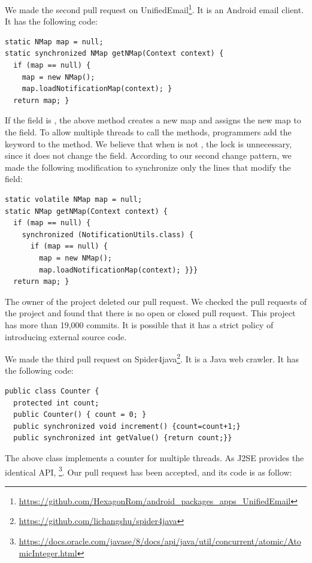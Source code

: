 We made the second pull request on UnifiedEmail\footnote{\url{https://github.com/HexagonRom/android_packages_apps_UnifiedEmail}}. It is an Android email client. It has the following code:

\begin{lstlisting}
static NMap map = null;
static synchronized NMap getNMap(Context context) {
  if (map == null) {
    map = new NMap();
    map.loadNotificationMap(context); }
  return map; }
\end{lstlisting}

If the  field is , the above method creates a new map and assigns the new map to the field. To allow multiple threads to call the methods, programmers add the  keyword to the method. We believe that when  is not , the lock is unnecessary, since it does not change the field. According to our second change pattern, we made the following modification to synchronize only the lines that modify the field:

\begin{lstlisting}
static volatile NMap map = null;
static NMap getNMap(Context context) {
  if (map == null) {
    synchronized (NotificationUtils.class) {
      if (map == null) {
        map = new NMap();
        map.loadNotificationMap(context); }}}
  return map; }
\end{lstlisting}

The owner of the project deleted our pull request. We checked the pull requests of the project and found that there is no open or closed pull request. This project has more than 19,000 commits. It is possible that it has a strict policy of introducing external source code.



We made the third pull request on Spider4java\footnote{\url{https://github.com/lichangshu/spider4java}}. It is a Java web crawler. It has the following code:

\begin{lstlisting}
public class Counter {
  protected int count;
  public Counter() { count = 0; }
  public synchronized void increment() {count=count+1;}
  public synchronized int getValue() {return count;}}
\end{lstlisting}

The above class implements a counter for multiple threads. As J2SE provides the identical API, \footnote{\url{https://docs.oracle.com/javase/8/docs/api/java/util/concurrent/atomic/AtomicInteger.html}}. Our pull request has been accepted, and its code is as follow:

